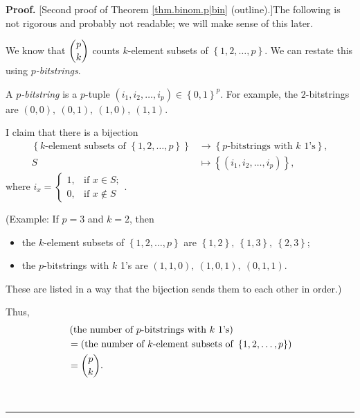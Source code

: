 \documentclass[numbers=enddot,12pt,final,onecolumn,notitlepage]{scrartcl}%
\numberwithin{exer}{subsection}
\theoremstyle{definition}
\newenvironment{proof}[1][Proof]{\noindent\textbf{#1.} }{\ \rule{0.5em}{0.5em}}
\newenvironment{noncompile}{}{}
\begin{document}
\begin{noncompile}
\begin{proof}
[Second proof of Theorem \ref{thm.binom.p|bin} (outline).]The following is not
rigorous and probably not readable; we will make sense of this later.

We know that $\dbinom{p}{k}$ counts $k$-element subsets of $\left\{
1,2,\ldots,p\right\}  $. We can restate this using $p$\textit{-bitstrings}.

A $p$\textit{-bitstring} is a $p$-tuple $\left(  i_{1},i_{2},\ldots
,i_{p}\right)  \in\left\{  0,1\right\}  ^{p}$. For example, the $2$-bitstrings
are $\left(  0,0\right)  ,\ \left(  0,1\right)  ,\ \left(  1,0\right)
,\ \left(  1,1\right)  $.

I claim that there is a bijection%
\begin{align*}
\left\{  k\text{-element subsets of }\left\{  1,2,\ldots,p\right\}  \right\}
&  \rightarrow\left\{  p\text{-bitstrings with }k\text{ 1's}\right\}  ,\\
S  &  \mapsto\left\{  \left(  i_{1},i_{2},\ldots,i_{p}\right)  \right\}  ,
\end{align*}
where $i_{x}=%
\begin{cases}
1, & \text{if }x\in S;\\
0, & \text{if }x\notin S
\end{cases}
$.

(Example: If $p=3$ and $k=2$, then

\begin{itemize}
\item the $k$-element subsets of $\left\{  1,2,\ldots,p\right\}  $ are
$\left\{  1,2\right\}  ,\ \left\{  1,3\right\}  ,\ \left\{  2,3\right\}  $;

\item the $p$-bitstrings with $k$ 1's are $\left(  1,1,0\right)  ,\ \left(
1,0,1\right)  ,\ \left(  0,1,1\right)  $.
\end{itemize}

These are listed in a way that the bijection sends them to each other in order.)

Thus,%
\begin{align*}
&  \left(  \text{the number of }p\text{-bitstrings with }k\text{ 1's}\right)
\\
&  =\left(  \text{the number of }k\text{-element subsets of }\left\{
1,2,\ldots,p\right\}  \right) \\
&  =\dbinom{p}{k}.
\end{align*}



\end{proof}
\end{noncompile}
\end{document}
